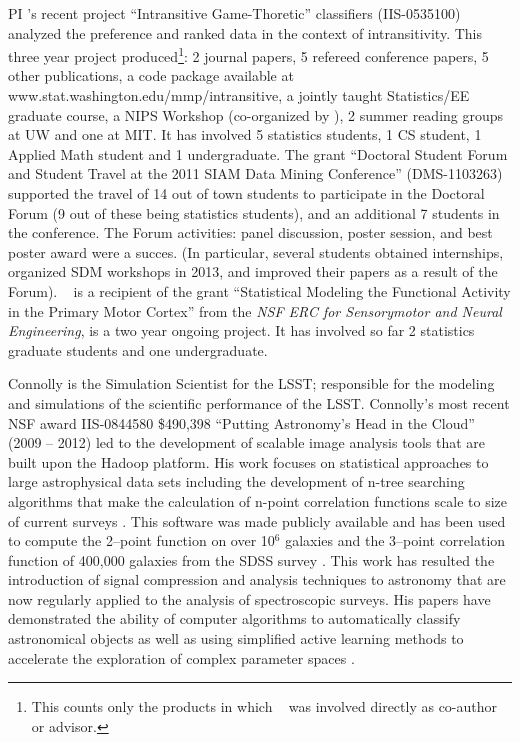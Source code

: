 PI \meila's recent project ``Intransitive Game-Thoretic'' classifiers
(IIS-0535100) analyzed the preference and ranked data in the context
of intransitivity. This three year project produced\footnote{This
  counts only the products in which \meila~ was involved directly as
  co-author or advisor.}: 2 journal papers, 5 refereed conference
papers, 5 other publications, a code package available at
{www.stat.washington.edu/mmp/intransitive}, a jointly taught
Statistics/EE graduate course, a NIPS Workshop (co-organized by
\meila), 2 summer reading groups at UW and one at MIT. It has involved
5 statistics students, 1 CS student, 1 Applied Math student and 1
undergraduate. The grant ``Doctoral Student Forum and Student Travel
at the 2011 SIAM Data Mining Conference'' (DMS-1103263) supported the
travel of 14 out of town students to participate in the Doctoral Forum
(9 out of these being statistics students), and an additional 7
students in the conference. The Forum activities: panel discussion,
poster session, and best poster award were a succes. (In particular,
several students obtained internships, organized SDM workshops in
2013, and improved their papers as a result of the Forum). \meila~ is
a recipient of the grant ``Statistical Modeling the Functional
Activity in the Primary Motor Cortex'' from the {\em NSF ERC for
  Sensorymotor and Neural Engineering}, is a two year ongoing
project. It has involved so far 2 statistics graduate students and one
undergraduate.

Connolly is the Simulation Scientist for the LSST; responsible for the
modeling and simulations of the scientific performance of the
LSST. Connolly's most recent NSF award IIS-0844580 \$490,398 ``Putting
Astronomy's Head in the Cloud'' (2009 -- 2012) led to the development
of scalable image analysis tools that are built upon the Hadoop
platform\citep{wiley2011}. His work focuses on statistical approaches
to large astrophysical data sets including the development of n-tree
searching algorithms that make the calculation of n-point correlation
functions scale to size of current surveys \cite{Moore00}. This
software was made publicly available and has been used to compute the
2--point function on over 10$^6$ galaxies and the 3--point correlation
function of 400,000 galaxies from the SDSS survey
\cite{Scranton2002,Szapudi2002,Nichol2006,mcbride2011a,mcbride2011b}. This
work has resulted the introduction of signal compression and analysis
techniques to astronomy that are now regularly applied to the analysis
of spectroscopic surveys. His papers have demonstrated the ability of
computer algorithms to automatically classify astronomical objects
\cite{vdp2009,daniel2011} as well as using simplified active learning
methods to accelerate the exploration of complex parameter spaces
\cite{daniel2012}.

